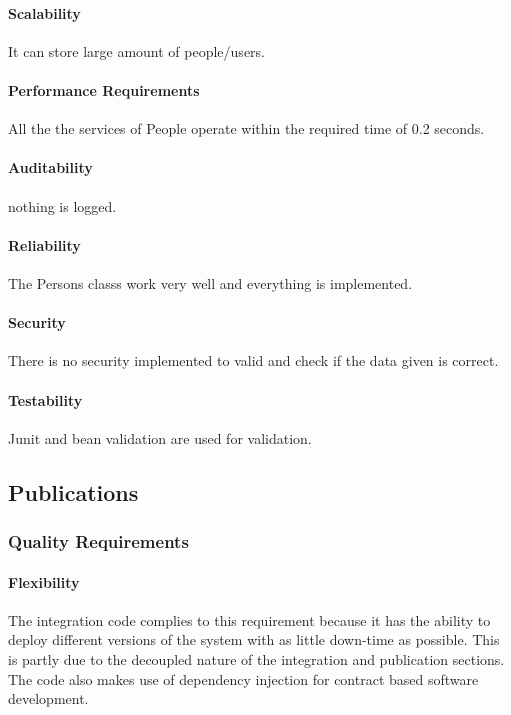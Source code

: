 \documentclass{article}
\begin{document}
            \paragraph{Scalability}
            It can store large amount of people/users.
            
            \paragraph{Performance Requirements}
            All the the services of People operate within the required time of 0.2 seconds.
            
            \paragraph{Auditability}
            nothing is logged.
            
            \paragraph{Reliability}
            The Persons classs work very well and everything is implemented.
            
            \paragraph{Security}
            There is no security implemented to valid and check if the data given is correct.
            
            \paragraph{Testability}
            Junit and bean validation are used for validation.
				
    \subsection{Publications}
    	\subsubsection{Quality Requirements}
    		\paragraph{Flexibility}
            The integration code complies to this requirement because it has the ability to deploy different versions of the system with as little down-time as possible. This is partly due to the decoupled nature of the integration and publication sections. The code also makes use of dependency injection for contract based software development.
    
\end{document}
